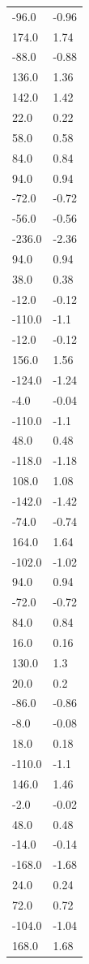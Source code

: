 \begin{longtable}{ll}
-96.0 & -0.96 \\
174.0 & 1.74 \\
-88.0 & -0.88 \\
136.0 & 1.36 \\
142.0 & 1.42 \\
22.0 & 0.22 \\
58.0 & 0.58 \\
84.0 & 0.84 \\
94.0 & 0.94 \\
-72.0 & -0.72 \\
-56.0 & -0.56 \\
-236.0 & -2.36 \\
94.0 & 0.94 \\
38.0 & 0.38 \\
-12.0 & -0.12 \\
-110.0 & -1.1 \\
-12.0 & -0.12 \\
156.0 & 1.56 \\
-124.0 & -1.24 \\
-4.0 & -0.04 \\
-110.0 & -1.1 \\
48.0 & 0.48 \\
-118.0 & -1.18 \\
108.0 & 1.08 \\
-142.0 & -1.42 \\
-74.0 & -0.74 \\
164.0 & 1.64 \\
-102.0 & -1.02 \\
94.0 & 0.94 \\
-72.0 & -0.72 \\
84.0 & 0.84 \\
16.0 & 0.16 \\
130.0 & 1.3 \\
20.0 & 0.2 \\
-86.0 & -0.86 \\
-8.0 & -0.08 \\
18.0 & 0.18 \\
-110.0 & -1.1 \\
146.0 & 1.46 \\
-2.0 & -0.02 \\
48.0 & 0.48 \\
-14.0 & -0.14 \\
-168.0 & -1.68 \\
24.0 & 0.24 \\
72.0 & 0.72 \\
-104.0 & -1.04 \\
168.0 & 1.68 \\

\end{longtable}

